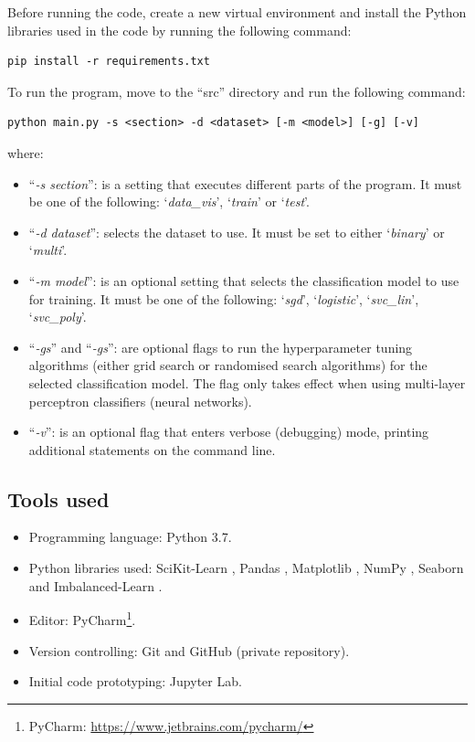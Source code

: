 \documentclass[letterpaper,12pt]{article}
\begin{document}
Before running the code, create a new virtual environment and install the Python libraries used in the code by running the following command:

\begin{lstlisting}
pip install -r requirements.txt
\end{lstlisting}

To run the program, move to the “src” directory and run the following command:

\begin{lstlisting}
python main.py -s <section> -d <dataset> [-m <model>] [-g] [-v]
\end{lstlisting}

where:
\begin{itemize}
    \item``\textit{-s section}'': is a setting that executes different parts of the program. It must be one of the following: `\textit{data\_vis}', `\textit{train}' or `\textit{test}'.
    \item``\textit{-d dataset}'': selects the dataset to use. It must be set to either `\textit{binary}' or `\textit{multi}'.
    \item``\textit{-m model}'': is an optional setting that selects the classification model to use for training. It must be one of the following: `\textit{sgd}', `\textit{logistic}', `\textit{svc\_lin}', `\textit{svc\_poly}'.
    \item``\textit{-gs}'' and ``\textit{-gs}'': are optional flags to run the hyperparameter tuning algorithms (either grid search or randomised search algorithms) for the selected classification model. The flag only takes effect when using multi-layer perceptron classifiers (neural networks).
    \item``\textit{-v}'': is an optional flag that enters verbose (debugging) mode, printing additional statements on the command line.
\end{itemize}

\subsection{Tools used}

\begin{itemize}
    \item Programming language: Python 3.7.
    \item Python libraries used: SciKit-Learn \cite{scikit-learn}, Pandas \cite{reback2020pandas}, Matplotlib \cite{Hunter:2007}, NumPy \cite{numpy},  Seaborn \cite{seaborn} and Imbalanced-Learn \cite{JMLR:v18:16-365}.
    \item Editor: PyCharm\footnote{PyCharm: \url{https://www.jetbrains.com/pycharm/}}.
    \item Version controlling: Git and GitHub (private repository).
    \item Initial code prototyping: Jupyter Lab.
\end{itemize}
\end{document}
